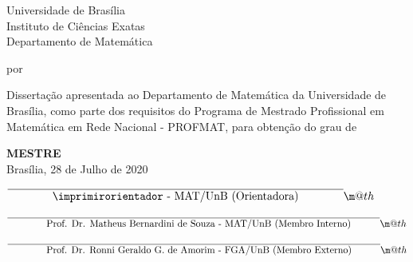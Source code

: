 \documentclass[12pt, openright, a4paper, brazil, english, french, spanish, bibjustif, openany, oneside]{abntex2}
\makeatletter
\newcommand*{\textoverline}[1]{$\overline{\hbox{#1}}\m@th$}
\makeatother
\begin{document}
\begin{folhadeaprovacao}

\begin{center}
 Universidade de Bras\'ilia \\
 Instituto de Ci\^encias Exatas \\
 Departamento de Matem\'atica
\end{center}
\begin{center}
    \vspace{0.3cm}
 \LARGE{\textbf{\imprimirtitulo}}
    \vspace{0.3cm}
\end{center}
\begin{center}
 por \\
    \vspace{0.5cm}
 \LARGE{\textbf{\imprimirautor}}
\end{center}

    \vspace{0.5cm}
\noindent Disserta\c c\~ao apresentada ao Departamento de Matem\'atica da Universidade de Bras\'ilia,
como parte dos requisitos do Programa de Mestrado Profissional em Matem\'atica em Rede 
Nacional - PROFMAT, para obten\c c\~ao do grau de 
\begin{center}
    \vspace{0.2cm}
 \LARGE{\textbf{MESTRE}}\\
    \vspace{0.5cm}
 Bras\'ilia, 28 de Julho de 2020 %
\end{center}

    \vspace{1.5cm}

\vspace*{8mm}

\textoverline{\phantom{xxxxxxx} \imprimirorientador - MAT/UnB (Orientadora)\phantom{xxxxxxx}  }

\vspace*{1cm}

\textoverline{\phantom{xxxxxxx}  Prof. Dr. Matheus Bernardini de Souza - MAT/UnB (Membro Interno)\phantom{xxxxx} }

\vspace*{1cm}

\textoverline{\phantom{xxxxxxx}  Prof. Dr. Ronni Geraldo G. de Amorim - FGA/UnB (Membro Externo)\phantom{xxxxx}  }

\vspace*{1cm}

\vspace*{1cm}

\end{folhadeaprovacao}
\end{document}

